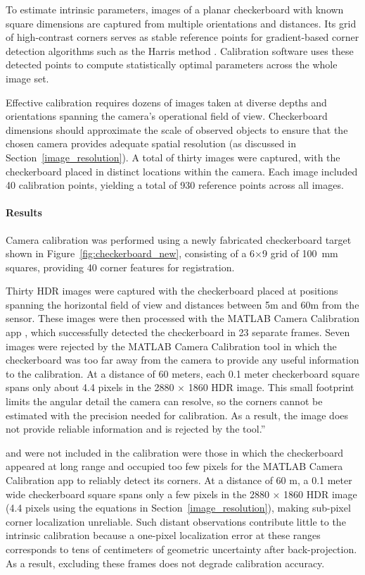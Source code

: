 \documentclass{erauthesis}
\begin{document}
To estimate intrinsic parameters, images of a planar checkerboard with known square dimensions are captured from multiple orientations and distances.  
Its grid of high-contrast corners serves as stable reference points for gradient-based corner detection algorithms such as the Harris method \cite{derpanis}.  
Calibration software uses these detected points to compute statistically optimal parameters across the whole image set.

Effective calibration requires dozens of images taken at diverse depths and orientations spanning the camera’s operational field of view.  
Checkerboard dimensions should approximate the scale of observed objects to ensure that the chosen camera provides adequate spatial resolution (as discussed in Section~\ref{image_resolution}).  
A total of thirty images were captured, with the checkerboard placed in distinct locations within the camera. Each image included 40 calibration points, yielding a total of 930 reference points across all images.


\paragraph{Results}
Camera calibration was performed using a newly fabricated checkerboard target shown in Figure~\ref {fig:checkerboard_new}, consisting of a 6$\times$9 grid of 100~mm squares, providing 40 corner features for registration.  

Thirty \ac{HDR} images were captured with the checkerboard placed at positions spanning the horizontal field of view and distances between 5m and 60m from the sensor.
These images were then processed with the MATLAB Camera Calibration app \cite{matlab_calibration}, which successfully detected the checkerboard in 23 separate frames. 
Seven images were rejected by the MATLAB Camera Calibration tool in which the checkerboard was too far away from the camera to provide any useful information to the calibration. At a distance of 60 meters, each 0.1 meter checkerboard square spans only about 4.4 pixels in the 2880 $\times$ 1860 HDR image. This small footprint limits the angular detail the camera can resolve, so the corners cannot be estimated with the precision needed for calibration. As a result, the image does not provide reliable information and is rejected by the tool.”

and were not included in the calibration were those in which the checkerboard appeared at long range and occupied too few pixels for the MATLAB Camera Calibration app to reliably detect its corners. 
At a distance of 60 m, a 0.1 meter wide checkerboard square spans only a few pixels in the 2880 × 1860 HDR image (4.4 pixels using the equations in Section~\ref{image_resolution}), making sub-pixel corner localization unreliable. 
Such distant observations contribute little to the intrinsic calibration because a one-pixel localization error at these ranges corresponds to tens of centimeters of geometric uncertainty after back-projection. 
As a result, excluding these frames does not degrade calibration accuracy.
\end{document}
